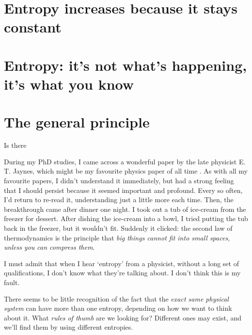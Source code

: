 \documentclass[a4paper, 12pt]{article}
\begin{document}







\section*{Entropy increases because it stays constant}

\section*{Entropy: it's not what's happening, it's what you know}

\section*{The general principle}
Is there

During my PhD studies, I came across a wonderful paper by the late physicist
E. T. Jaynes, which might be my favourite physics paper of all time
\citep{jaynes}. As with all my favourite papers, I didn't understand it
immediately, but had a strong feeling that I should persist because it seemed
important and profound. Every so often, I'd return to re-read it, understanding
just a little more each time. Then, the breakthrough came after dinner one
night. I took out a tub of ice-cream from the freezer for dessert. After dishing
the ice-cream into a bowl, I tried putting the tub back in the freezer, but
it wouldn't fit. Suddenly it clicked: the second law of thermodynamics is the
principle that {\em big things cannot fit into small spaces, unless you can
compress them}.

I must admit that when I hear `entropy' from a physicist, without a long
set of qualifications, I don't know what they're talking about.
I don't think this is my fault.

There seems to be little recognition of the fact
that the {\em exact same physical system}
can have more than one entropy, depending on how we want to think about it.
What {\em rules of thumb} are we looking for? Different ones may exist, and
we'll find them by using different entropies.
\end{document}
